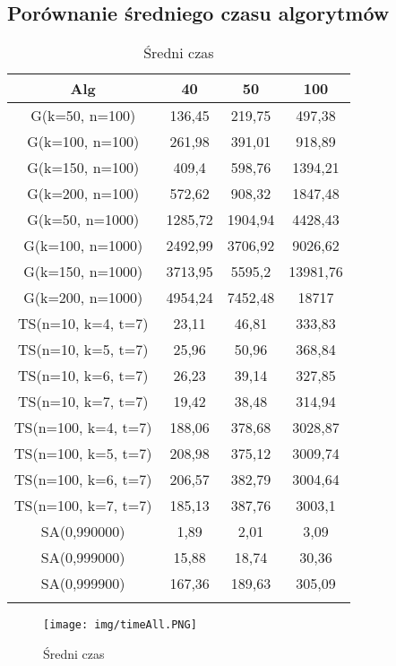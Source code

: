 \documentclass[wide,a4paper,titlepage,12pt] {article}
\begin{document}
\subsection{Porównanie średniego czasu algorytmów}
\begin{center}
    \begin{longtable}{|c|c|c|c|}
        \hline
        Alg & 40 & 50 & 100 \\ \hline
        G(k=50, n=100) & 136,45 & 219,75 & 497,38\\ \hline
        G(k=100, n=100)& 261,98 & 391,01 & 918,89\\ \hline
        G(k=150, n=100)& 409,4 &  598,76 & 1394,21\\ \hline
        G(k=200, n=100)& 572,62 & 908,32 & 1847,48\\ \hline
        G(k=50, n=1000)& 1285,72& 1904,94& 4428,43\\ \hline
        G(k=100, n=1000)  &  2492,99 &3706,92& 9026,62\\ \hline
        G(k=150, n=1000)   & 3713,95 &5595,2  &13981,76\\ \hline
        G(k=200, n=1000)   & 4954,24& 7452,48& 18717\\ \hline
        TS(n=10, k=4, t=7) & 23,11 &  46,81 &  333,83\\ \hline
        TS(n=10, k=5, t=7) & 25,96 &  50,96 &  368,84\\ \hline
        TS(n=10, k=6, t=7) & 26,23 &  39,14 &  327,85\\ \hline
        TS(n=10, k=7, t=7) & 19,42  & 38,48  & 314,94\\ \hline
        TS(n=100, k=4, t=7)& 188,06 & 378,68 & 3028,87\\ \hline
        TS(n=100, k=5, t=7)& 208,98 & 375,12 & 3009,74\\ \hline
        TS(n=100, k=6, t=7)& 206,57 & 382,79 & 3004,64\\ \hline
        TS(n=100, k=7, t=7) &185,13  &387,76 & 3003,1\\ \hline
        SA(0,990000)  &  1,89  &  2,01 &   3,09\\ \hline
        SA(0,999000)  &  15,88 &  18,74 &  30,36\\ \hline
        SA(0,999900)  &  167,36 & 189,63 & 305,09\\ \hline
                \caption{Średni czas}
    \end{longtable}
    
\end{center}

\begin{landscape}
\begin{figure}[htbp]
  \begin{center}
         \texttt{[image: img/timeAll.PNG]}
         \caption{Średni czas}
  \end{center}
\end{figure}
\end{landscape}
\end{document}
